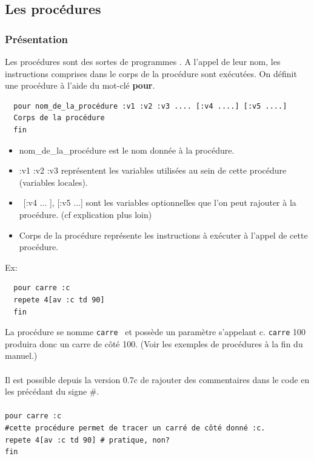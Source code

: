 \subsection{Les procédures}
\subsubsection{Présentation}
Les procédures sont des sortes de \og programmes \fg. A l'appel de
leur nom, les instructions comprises dans le corps de la procédure
sont exécutées. On définit une procédure à l'aide du mot-clé \textbf{pour}.\\

\begin{verbatim}
  pour nom_de_la_procédure :v1 :v2 :v3 .... [:v4 ....] [:v5 ....]
  Corps de la procédure
  fin
\end{verbatim}

\noindent \begin{itemize}
\item nom\_de\_la\_procédure est le nom donnée à la procédure.
\item   :v1 :v2 :v3 représentent les variables utilisées au sein de cette procédure (variables locales).
\item \ [:v4 ... ], [:v5 ...] sont les variables optionnelles que l'on peut rajouter à la procédure. (cf explication plus loin)
 \item  Corps de la procédure représente les instructions à exécuter à l'appel de cette procédure.
\end{itemize}
Ex: \begin{verbatim}
  pour carre :c
  repete 4[av :c td 90]
  fin
\end{verbatim}

La procédure se nomme \texttt{carre} \ et possède un paramètre s'appelant
c. \texttt{carre} 100 produira donc un carre de côté 100. (Voir les
exemples de procédures à la fin du manuel.)\\
\\
Il est possible depuis la version 0.7c de rajouter des commentaires dans le code en les précédant du signe \#.\\
\\
 \texttt{pour carre :c\\
		\#cette procédure permet de tracer un carré de côté donné :c.\\
		repete 4[av :c td 90] \# pratique, non?\\
		fin\\
}\\


